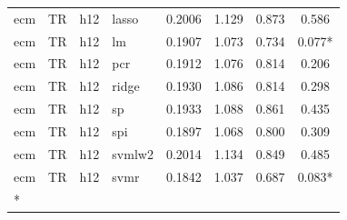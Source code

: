 \begin{ThreePartTable}
\begin{longtable}[t]{llclcccc}
ecm & TR & h12 & lasso & 0.2006 & 1.129 & 0.873 & 0.586\\
ecm & TR & h12 & lm & 0.1907 & 1.073 & 0.734 & 0.077*\\
ecm & TR & h12 & pcr & 0.1912 & 1.076 & 0.814 & 0.206\\
ecm & TR & h12 & ridge & 0.1930 & 1.086 & 0.814 & 0.298\\
ecm & TR & h12 & sp & 0.1933 & 1.088 & 0.861 & 0.435\\
ecm & TR & h12 & spi & 0.1897 & 1.068 & 0.800 & 0.309\\
ecm & TR & h12 & svmlw2 & 0.2014 & 1.134 & 0.849 & 0.485\\
ecm & TR & h12 & svmr & 0.1842 & 1.037 & 0.687 & 0.083*\\*
\end{longtable}
\end{ThreePartTable}
\endgroup{}
